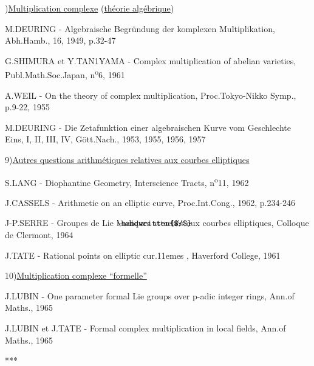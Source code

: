 \clearpage
{}
\reversemarginpar
{}
\normalmarginpar
{}

)\quad \uline{Multiplication complexe} (\uline{théorie algébrique})

M.DEURING - Algebraische Begründung der komplexen Multiplikation, Abh.Hamb., 16, 1949, p.32-47

\reversemarginpar
{}
G.SHIMURA et Y.TAN1YAMA - Complex multiplication of abelian varieties, Publ.Math.Soc.Japan, n\textsuperscript{o}6, 1961

A.WEIL - On the theory of complex multiplication, Proc.Tokyo-Nikko Symp., p.9-22, 1955

M.DEURING - Die Zetafunktion einer algebraischen Kurve vom Geschlechte Eins, I, II, III, IV, Gött.Nach., 1953, 1955, 1956, 1957

9)\quad \uline{Autres questions arithmétiques relatives aux courbes elliptiques}

S.LANG - Diophantine Geometry, Interscience Tracts, n\textsuperscript{o}11, 1962

J.CASSELS - Arithmetic on an elliptic curve, Proc.Int.Cong., 1962, p.234-246

J-P.SERRE - Groupes de Lie $\mathord{\rlap{\handwritten{$/$}}\mathrm{l}}$-adiques attachés aux courbes elliptiques, Colloque de Clermont, 1964

J.TATE - Rational points on elliptic cur\makebox[0pt][l]{\deleted{:}}\kern.11emes , Haverford College, 1961

10)\quad \uline{Multiplication complexe ``formelle''}

J.LUBIN - One parameter formal Lie groups over $\mathrm{p}$-adic integer rings, Ann.of Maths., 1965

J.LUBIN et J.TATE - Formal complex multiplication in local fields, Ann.of Maths., 1965

\begin{center}
***
\end{center}
\normalmarginpar
